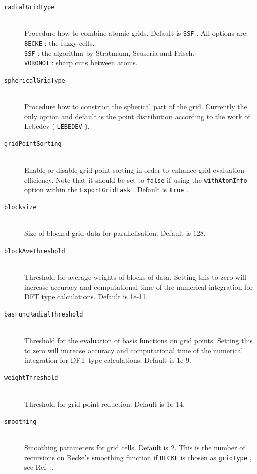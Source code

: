 \documentclass[bibliography=totocnumbered,a4paper,10pt,oneside]{scrbook}
\newcommand{\ttt}[1]{%
  \begingroup\setlength{\fboxsep}{1pt}%
  \colorbox{serenity-green!30}{\texttt{\hspace*{2pt}\vphantom{(g}#1\hspace*{2pt}}}%
  \endgroup
}
\begin{document}
\begin{description}
    \item [\texttt{radialGridType}]\hfill \\
    Procedure how to combine atomic grids. Default is \ttt{SSF}.
    All options are:\\
    \ttt{BECKE}: the fuzzy cells\cite{beck1988}.\\ 
    \ttt{SSF}: the algorithm by Stratmann, Scuseria and Frisch\cite{stra1996}.\\ 
    \ttt{VORONOI}: sharp cuts between atoms.
    \item [\texttt{sphericalGridType}]\hfill \\
    Procedure how to construct the spherical part of the grid. Currently the only option and default is 
    the point distribution according to the work of Lebedev (\ttt{LEBEDEV}).
    \item [\texttt{gridPointSorting}]\hfill \\
    Enable or disable grid point sorting in order to enhance grid evaluation efficiency. Note that it should be
    set to \ttt{false} if using the \ttt{withAtomInfo} option within the \ttt{ExportGridTask}. Default is \ttt{true}.
    \item [\texttt{blocksize}]\hfill \\
    Size of blocked grid data  for parallelisation. Default is $128$.
    \item [\texttt{blockAveThreshold}]\hfill \\
    Threshold for average weights of blocks of data. Setting this to zero will increase accuracy and computational time of the numerical 
    integration for DFT type calculations. Default is 1e-11.
    \item [\texttt{basFuncRadialThreshold}]\hfill \\
    Threshold for the evaluation of basis functions on grid points. Setting this to zero will increase accuracy and computational time of the numerical 
    integration for DFT type calculations. Default is 1e-9.
    \item [\texttt{weightThreshold}]\hfill \\
    Threshold for grid point reduction. Default is 1e-14.
    \item [\texttt{smoothing}]\hfill \\
    Smoothing parameters for grid cells. Default is 2. This is the number of recursions on Becke's smoothing 
    function if \ttt{BECKE} is chosen as \ttt{gridType}, see Ref.~\cite{beck1988}.
 \end{description}
\end{document}
